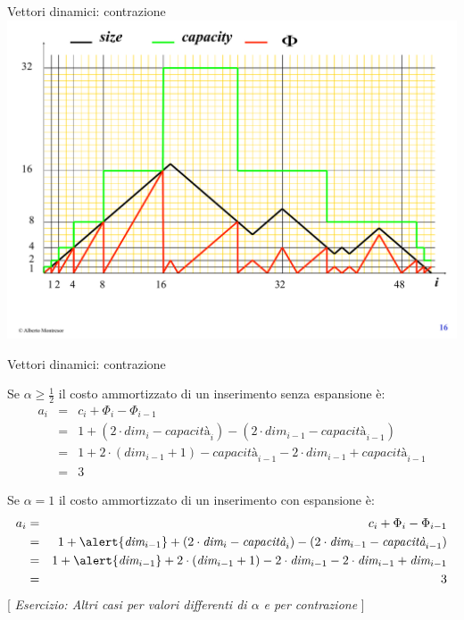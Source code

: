 \begin{frame}[shrink]{Vettori dinamici: contrazione}
	\includegraphics{dynvector.pdf}
\end{frame}

\begin{frame}[shrink]{Vettori dinamici: contrazione}

Se \alert{$\alpha \geq \frac{1}{2}$} il costo ammortizzato di un inserimento \alert{senza espansione} è: 
{\small
\begin{eqnarray*}
a_i &=& c_i + \Phi_i - \Phi_{i-1} \\
    &=& 1 + ( 2 \cdot \textit{dim}_i - \textit{capacità}_i) - ( 2 \cdot \textit{dim}_{i-1} - \textit{capacità}_{i-1})\\
    &=& 1 +  2 \cdot (\textit{dim}_{i-1}+1) - \textit{capacità}_{i-1} -  2 \cdot \textit{dim}_{i-1} + \textit{capacità}_{i-1}\\
    &=& 3
\end{eqnarray*}
}

Se \alert{$\alpha = 1$} il costo ammortizzato di un inserimento \alert{con espansione} è: 
{\small
\begin{eqnarray*}
a_i &=& c_i + \Phi_i - \Phi_{i-1} \\
    &=& 1 + \alert{\textit{dim}_{i-1}} + ( 2 \cdot \textit{dim}_i - \textit{capacità}_i) - ( 2 \cdot \textit{dim}_{i-1} - \textit{capacità}_{i-1})\\
    &=& 1 + \alert{\textit{dim}_{i-1}} +  2 \cdot (\textit{dim}_{i-1}+1) - 2 \cdot \textit{dim}_{i-1} -  2 \cdot \textit{dim}_{i-1} + \textit{dim}_{i-1}\\
    &=& 3
\end{eqnarray*}
}
[ \emph{Esercizio: Altri casi per valori differenti di $\alpha$ e per contrazione} ]
\end{frame}

